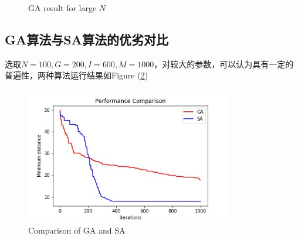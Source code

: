 \documentclass[12pt]{article}
\begin{document}
\begin{figure}[H]
  \caption{GA result for large $N$}
  \label{pic: GA large N}
\end{figure}



\subsection{GA算法与SA算法的优劣对比}
选取$N=100,G=200,I=600,M=1000$，对较大的参数，可以认为具有一定的普遍性，两种算法运行结果如Figure (\ref{pic: comparison GA SA})
\begin{figure}[H]
    \centering
    \includegraphics[height = 6cm]{../figure/Compare_GASA_test_100_200_1000_1.jpg}
    \caption{Comparison of GA and SA}
    \label{pic: comparison GA SA}
\end{figure}
\end{document}
